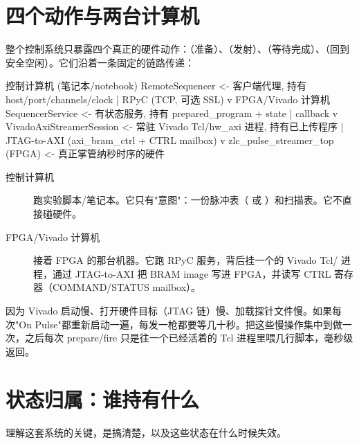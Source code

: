 \documentclass[11pt,oneside,openany]{book}
\begin{document}
\section{四个动作与两台计算机}

整个控制系统只暴露四个真正的硬件动作：（准备）、（发射）、（等待完成）、（回到安全空闲）。它们沿着一条固定的链路传递：

\begin{codeblock}[text]
控制计算机 (笔记本/notebook)
  RemoteSequencer            <- 客户端代理, 持有 host/port/channels/clock
      |  RPyC (TCP, 可选 SSL)
      v
FPGA/Vivado 计算机
  SequencerService           <- 有状态服务, 持有 prepared_program + state
      |  callback
      v
  VivadoAxiStreamerSession   <- 常驻 Vivado Tcl/hw_axi 进程, 持有已上传程序
      |  JTAG-to-AXI (axi_bram_ctrl + CTRL mailbox)
      v
  zlc_pulse_streamer_top (FPGA) <- 真正掌管纳秒时序的硬件
\end{codeblock}

\begin{description}
\item[控制计算机] 跑实验脚本/笔记本。它只有"意图"：一份脉冲表（ 或 ）和扫描表。它不直接碰硬件。
\item[FPGA/Vivado 计算机] 接着 FPGA 的那台机器。它跑 RPyC 服务，背后挂一个的 Vivado Tcl/ 进程，通过 JTAG-to-AXI 把 BRAM image 写进 FPGA，并读写 CTRL 寄存器（COMMAND/STATUS mailbox）。
\end{description}

 因为 Vivado 启动慢、打开硬件目标（JTAG 链）慢、加载探针文件慢。如果每次"On Pulse"都重新启动一遍，每发一枪都要等几十秒。把这些慢操作集中到做一次，之后每次 prepare/fire 只是往一个已经活着的 Tcl 进程里喂几行脚本，毫秒级返回。

\section{状态归属：谁持有什么}

理解这套系统的关键，是搞清楚，以及这些状态在什么时候失效。
\end{document}
